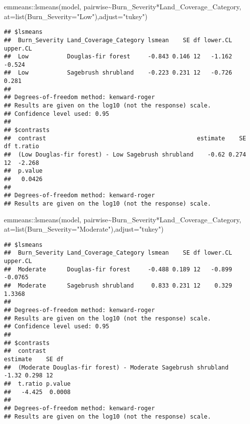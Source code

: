 \documentclass[
]{article}
\newenvironment{Shaded}{\begin{snugshade}}{\end{snugshade}}
\newcommand{\AttributeTok}[1]{\textcolor[rgb]{0.77,0.63,0.00}{#1}}
\newcommand{\FunctionTok}[1]{\textcolor[rgb]{0.00,0.00,0.00}{#1}}
\newcommand{\NormalTok}[1]{#1}
\newcommand{\SpecialCharTok}[1]{\textcolor[rgb]{0.00,0.00,0.00}{#1}}
\newcommand{\StringTok}[1]{\textcolor[rgb]{0.31,0.60,0.02}{#1}}
\begin{document}
\begin{Shaded}
\begin{Highlighting}[]
\NormalTok{emmeans}\SpecialCharTok{::}\FunctionTok{lsmeans}\NormalTok{(model, pairwise}\SpecialCharTok{\textasciitilde{}}\NormalTok{Burn\_Severity}\SpecialCharTok{*}\NormalTok{Land\_Coverage\_Category, }\AttributeTok{at=}\FunctionTok{list}\NormalTok{(}\AttributeTok{Burn\_Severity=}\StringTok{"Low"}\NormalTok{),}\AttributeTok{adjust=}\StringTok{"tukey"}\NormalTok{)}
\end{Highlighting}
\end{Shaded}

\begin{verbatim}
## $lsmeans
##  Burn_Severity Land_Coverage_Category lsmean    SE df lower.CL upper.CL
##  Low           Douglas-fir forest     -0.843 0.146 12   -1.162   -0.524
##  Low           Sagebrush shrubland    -0.223 0.231 12   -0.726    0.281
## 
## Degrees-of-freedom method: kenward-roger 
## Results are given on the log10 (not the response) scale. 
## Confidence level used: 0.95 
## 
## $contrasts
##  contrast                                           estimate    SE df t.ratio
##  (Low Douglas-fir forest) - Low Sagebrush shrubland    -0.62 0.274 12  -2.268
##  p.value
##   0.0426
## 
## Degrees-of-freedom method: kenward-roger 
## Results are given on the log10 (not the response) scale.
\end{verbatim}

\begin{Shaded}
\begin{Highlighting}[]
\NormalTok{emmeans}\SpecialCharTok{::}\FunctionTok{lsmeans}\NormalTok{(model, pairwise}\SpecialCharTok{\textasciitilde{}}\NormalTok{Burn\_Severity}\SpecialCharTok{*}\NormalTok{Land\_Coverage\_Category, }\AttributeTok{at=}\FunctionTok{list}\NormalTok{(}\AttributeTok{Burn\_Severity=}\StringTok{"Moderate"}\NormalTok{),}\AttributeTok{adjust=}\StringTok{"tukey"}\NormalTok{)}
\end{Highlighting}
\end{Shaded}

\begin{verbatim}
## $lsmeans
##  Burn_Severity Land_Coverage_Category lsmean    SE df lower.CL upper.CL
##  Moderate      Douglas-fir forest     -0.488 0.189 12   -0.899  -0.0765
##  Moderate      Sagebrush shrubland     0.833 0.231 12    0.329   1.3368
## 
## Degrees-of-freedom method: kenward-roger 
## Results are given on the log10 (not the response) scale. 
## Confidence level used: 0.95 
## 
## $contrasts
##  contrast                                                     estimate    SE df
##  (Moderate Douglas-fir forest) - Moderate Sagebrush shrubland    -1.32 0.298 12
##  t.ratio p.value
##   -4.425  0.0008
## 
## Degrees-of-freedom method: kenward-roger 
## Results are given on the log10 (not the response) scale.
\end{verbatim}
\end{document}
